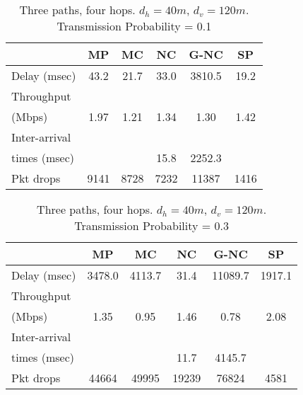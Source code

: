 \documentclass[journal, onecolumn, 12pt]{IEEEtran}
\begin{document}
\begin{table}[hb]
\begin{center}
\scriptsize
\begin{tabular}{|l|c|c|c|c|c|}
\hline
~                                    & MP & MC & NC & G-NC & SP \\ \hline
Delay (msec)   & 43.2 & 21.7 & 33.0 & 3810.5 & 19.2 \\ \hline
Throughput                   & ~  & ~  & ~  & ~         & ~  \\
(Mbps)                   & 1.97 & 1.21 & 1.34 & 1.30 & 1.42 \\ \hline
Inter-arrival              & ~  & ~  & ~  & ~         & ~  \\
times (msec)   &   &   &  15.8 & 2252.3 & \\ \hline
Pkt drops  & 9141  & 8728  & 7232  & 11387 & 1416 \\ \hline
\end{tabular}
\end{center}
\caption {Three paths, four hops. $d_{h}=40m$, $d_{v}=120m$. Transmission Probability = 0.1}
\label{tab:sim_topol_2_0.1}
\end{table}

\begin{table}[hb]
\begin{center}
\scriptsize
\begin{tabular}{|l|c|c|c|c|c|}
\hline
~                                    & MP & MC & NC & G-NC & SP \\ \hline
Delay (msec)   & 3478.0 & 4113.7 & 31.4 & 11089.7 & 1917.1 \\ \hline
Throughput                   & ~  & ~  & ~  & ~         & ~  \\
(Mbps)                   & 1.35  & 0.95 & 1.46 & 0.78 & 2.08 \\ \hline
Inter-arrival              & ~  & ~  & ~  & ~         & ~  \\
times (msec)   &   &   &  11.7 & 4145.7 & \\ \hline
Pkt drops  & 44664  & 49995  & 19239  & 76824 & 4581 \\ \hline
\end{tabular}
\end{center}
\caption {Three paths, four hops. $d_{h}=40m$, $d_{v}=120m$. Transmission Probability = 0.3}
\label{tab:sim_topol_2_0.3}
\end{table}
\end{document}
